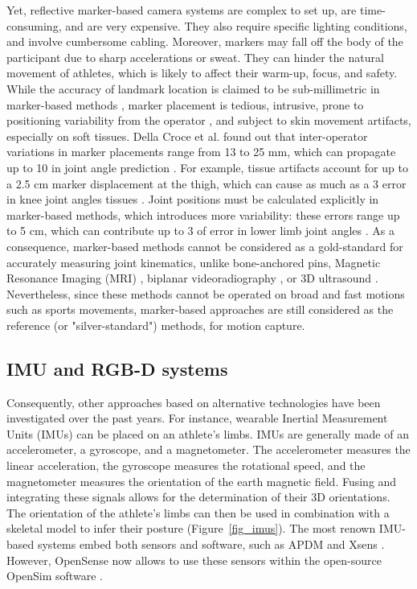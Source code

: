 Yet, reflective marker-based camera systems are complex to set up, are time-consuming, and are very expensive. They also require specific lighting conditions, and involve cumbersome cabling. Moreover, markers may fall off the body of the participant due to sharp accelerations or sweat. They can hinder the natural movement of athletes, which is likely to affect their warm-up, focus, and safety. While the accuracy of landmark location is claimed to be sub-millimetric in marker-based methods \cite{Topley2020}, marker placement is tedious, intrusive, prone to positioning variability from the operator \cite{Tsushima2003}, and subject to skin movement artifacts, especially on soft tissues. Della Croce et al. found out that inter-operator variations in marker placements range from 13 to 25 mm, which can propagate up to 10\degree{} in joint angle prediction \cite{Gorton2009,Croce1999}. For example, tissue artifacts account for up to a 2.5 cm marker displacement at the thigh, which can cause as much as a 3\degree{} error in knee joint angles tissues \cite{Benoit2015,Cappozzo1995}. Joint positions must be calculated explicitly in marker-based methods, which introduces more variability: these errors range up to 5 cm, which can contribute up to 3\degree{} of error in lower limb joint angles \cite{Leboeuf2019}. As a consequence, marker-based methods cannot be considered as a gold-standard for accurately measuring joint kinematics, unlike bone-anchored pins, Magnetic Resonance Imaging (MRI) \cite{Yahia2004}, biplanar videoradiography \cite{Miranda2013, Kessler2019}, or 3D ultrasound \cite{Peters2010}. Nevertheless, since these methods cannot be operated on broad and fast motions such as sports movements, marker-based approaches are still considered as the reference (or "silver-standard") methods, for motion capture.


\FloatBarrier
\subsection{IMU and RGB-D systems}

Consequently, other approaches based on alternative technologies have been investigated over the past years. For instance, wearable Inertial Measurement Units (IMUs) can be placed on an athlete's limbs. IMUs are generally made of an accelerometer, a gyroscope, and a magnetometer. The accelerometer measures the linear acceleration, the gyroscope measures the rotational speed, and the magnetometer measures the orientation of the earth magnetic field. Fusing and integrating these signals allows for the determination of their 3D orientations. The orientation of the athlete's limbs can then be used in combination with a skeletal model to infer their posture (Figure~\ref{fig_imus}). The most renown IMU-based systems embed both sensors and software, such as APDM \cite{APDM} and Xsens \cite{Xsens}. However, OpenSense now allows to use these sensors within the open-source OpenSim software \cite{Borno2022}.

